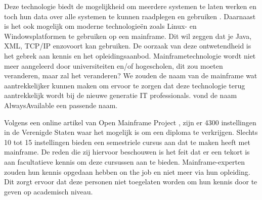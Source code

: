 Deze technologie biedt de mogelijkheid om meerdere systemen te laten werken en toch hun data over alle systemen te kunnen raadplegen en gebruiken \autocite{Sarkar2020}. Daarnaast is het ook mogelijk om moderne technologieën zoals Linux- en Windowsplatformen te gebruiken op een mainframe. Dit wil zeggen dat je Java, XML, TCP/IP enzovoort kan gebruiken. De oorzaak van deze ontwetendheid is het gebrek aan kennis en het opleidingsaanbod. Mainframetechnologie wordt niet meer aangeleerd door universiteiten en/of hogescholen, dit zou moeten veranderen, maar zal het veranderen? We zouden de naam van de mainframe wat aantrekkelijker kunnen maken om ervoor te zorgen dat deze technologie terug aantrekkelijk wordt bij de nieuwe generatie IT professionals. \textcite{Mullins2016} vond de naam AlwaysAvailable een passende naam.


Volgens een online artikel van Open Mainframe Project \autocite{2020}, zijn er 4300 instellingen in de Verenigde Staten waar het mogelijk is om een diploma te verkrijgen. Slechts 10 tot 15 instellingen bieden een semestriele cursus aan dat te maken heeft met mainframe. De reden die zij hiervoor beschouwen is het feit dat er een tekort is aan facultatieve kennis om deze cursussen aan te bieden. Mainframe-experten zouden hun kennis opgedaan hebben on the job en niet meer via hun opleiding. Dit zorgt ervoor dat deze personen niet toegelaten worden om hun kennis door te geven op academisch niveau. 

\section{}
\label{sec:De laatste nieuwe mainframe technologie}

